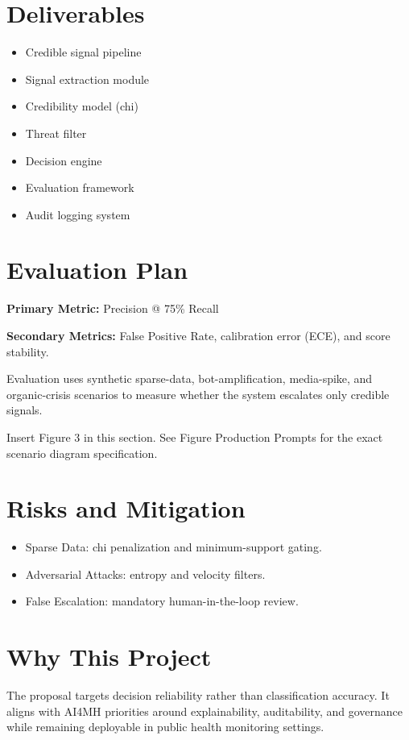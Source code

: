 \documentclass[11pt]{article}
\begin{document}
\section{Deliverables}

\begin{itemize}[leftmargin=*]
\item Credible signal pipeline
\item Signal extraction module
\item Credibility model (chi)
\item Threat filter
\item Decision engine
\item Evaluation framework
\item Audit logging system
\end{itemize}

\section{Evaluation Plan}

\textbf{Primary Metric:} Precision @ 75\% Recall

\textbf{Secondary Metrics:} False Positive Rate, calibration error (ECE), and score stability.

Evaluation uses synthetic sparse-data, bot-amplification, media-spike, and organic-crisis scenarios to measure whether the system escalates only credible signals.

Insert Figure 3 in this section. See Figure Production Prompts for the exact scenario diagram specification.

\section{Risks and Mitigation}

\begin{itemize}[leftmargin=*]
\item Sparse Data: chi penalization and minimum-support gating.
\item Adversarial Attacks: entropy and velocity filters.
\item False Escalation: mandatory human-in-the-loop review.
\end{itemize}

\section{Why This Project}

The proposal targets decision reliability rather than classification accuracy. It aligns with AI4MH priorities around explainability, auditability, and governance while remaining deployable in public health monitoring settings.
\end{document}
